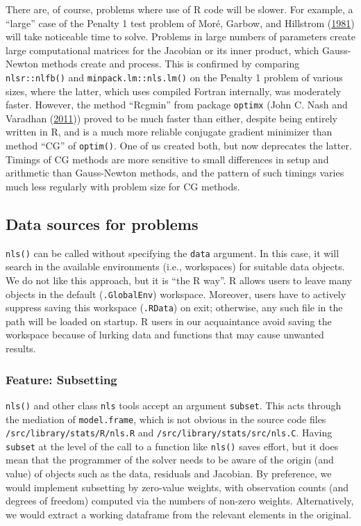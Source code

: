\documentclass[
]{article}
\begin{document}
There are, of course, problems where use of R code will be slower. For
example, a ``large'' case of the Penalty 1 test problem of Moré, Garbow,
and Hillstrom (\protect\hyperlink{ref-More1981TUO}{1981}) will take
noticeable time to solve. Problems in large numbers of parameters create
large computational matrices for the Jacobian or its inner product,
which Gauss-Newton methods create and process. This is confirmed by
comparing \texttt{nlsr::nlfb()} and \texttt{minpack.lm::nls.lm()} on the
Penalty 1 problem of various sizes, where the latter, which uses
compiled Fortran internally, was moderately faster. However, the method
``Rcgmin'' from package \texttt{optimx} (John C. Nash and Varadhan
(\protect\hyperlink{ref-p-optimx}{2011})) proved to be much faster than
either, despite being entirely written in R, and is a much more reliable
conjugate gradient minimizer than method ``CG'' of \texttt{optim()}. One
of us created both, but now deprecates the latter. Timings of CG methods
are more sensitive to small differences in setup and arithmetic than
Gauss-Newton methods, and the pattern of such timings varies much less
regularly with problem size for CG methods.

\hypertarget{data-sources-for-problems}{%
\subsection{Data sources for problems}\label{data-sources-for-problems}}

\texttt{nls()} can be called without specifying the \texttt{data}
argument. In this case, it will search in the available environments
(i.e., workspaces) for suitable data objects. We do not like this
approach, but it is ``the R way''. R allows users to leave many objects
in the default (\texttt{.GlobalEnv}) workspace. Moreover, users have to
actively suppress saving this workspace (\texttt{.RData}) on exit;
otherwise, any such file in the path will be loaded on startup. R users
in our acquaintance avoid saving the workspace because of lurking data
and functions that may cause unwanted results.

\hypertarget{feature-subsetting}{%
\subsubsection{Feature: Subsetting}\label{feature-subsetting}}

\texttt{nls()} and other class \texttt{nls} tools accept an argument
\texttt{subset}. This acts through the mediation of
\texttt{model.frame}, which is not obvious in the source code files
\texttt{/src/library/stats/R/nls.R} and
\texttt{/src/library/stats/src/nls.C}. Having \texttt{subset} at the
level of the call to a function like \texttt{nls()} saves effort, but it
does mean that the programmer of the solver needs to be aware of the
origin (and value) of objects such as the data, residuals and Jacobian.
By preference, we would implement subsetting by zero-value weights, with
observation counts (and degrees of freedom) computed via the numbers of
non-zero weights. Alternatively, we would extract a working dataframe
from the relevant elements in the original.
\end{document}
